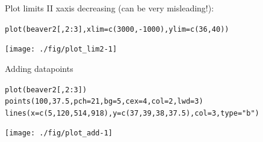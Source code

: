 \documentclass[xcolor=table,           xcolor=dvipsnames]{beamer}\usepackage[]{graphicx}\usepackage[]{color}
\makeatletter
\newcommand{\hlnum}[1]{\textcolor[rgb]{0,0,0}{#1}}
\newcommand{\hlstr}[1]{\textcolor[rgb]{0.545,0.137,0.137}{#1}}
\newcommand{\hlopt}[1]{\textcolor[rgb]{0,0,0}{#1}}
\newcommand{\hlstd}[1]{\textcolor[rgb]{0,0,0}{#1}}
\newcommand{\hlkwc}[1]{\textcolor[rgb]{1,0,1}{#1}}
\newcommand{\hlkwd}[1]{\textcolor[rgb]{0,0,1}{#1}}
\newenvironment{kframe}{%
 \def\at@end@of@kframe{}%
 \ifinner\ifhmode%
  \def\at@end@of@kframe{\end{minipage}}%
  \begin{minipage}{\columnwidth}%
 \fi\fi%
 \def\FrameCommand##1{\hskip\@totalleftmargin \hskip-\fboxsep
 \colorbox{shadecolor}{##1}\hskip-\fboxsep
     \hskip-\linewidth \hskip-\@totalleftmargin \hskip\columnwidth}%
 \MakeFramed {\advance\hsize-\width
   \@totalleftmargin\z@ \linewidth\hsize
   \@setminipage}}%
 {\par\unskip\endMakeFramed%
 \at@end@of@kframe}
\newenvironment{knitrout}{}{} %
\makeatother
\begin{document}

\begin{frame}[fragile]{Plot limits II}
xaxis decreasing (can be very misleading!):
\begin{knitrout}
\color{fgcolor}\begin{kframe}
\begin{alltt}
\hlkwd{plot}\hlstd{(beaver2[ ,}\hlnum{2}\hlopt{:}\hlnum{3}\hlstd{],} \hlkwc{xlim}\hlstd{=}\hlkwd{c}\hlstd{(}\hlnum{3000}\hlstd{,}\hlopt{-}\hlnum{1000}\hlstd{),} \hlkwc{ylim}\hlstd{=}\hlkwd{c}\hlstd{(}\hlnum{36}\hlstd{,}\hlnum{40}\hlstd{))}
\end{alltt}
\end{kframe}

{\centering \texttt{[image: ./fig/plot\_lim2-1]} 

}



\end{knitrout}
\end{frame}


\begin{frame}[fragile]{Adding datapoints}
\begin{knitrout}\scriptsize
{}\color{fgcolor}\begin{kframe}
\begin{alltt}
\hlkwd{plot}\hlstd{(beaver2[ ,}\hlnum{2}\hlopt{:}\hlnum{3}\hlstd{])}
\hlkwd{points}\hlstd{(}\hlnum{100}\hlstd{,} \hlnum{37.5}\hlstd{,} \hlkwc{pch}\hlstd{=}\hlnum{21}\hlstd{,} \hlkwc{bg}\hlstd{=}\hlnum{5}\hlstd{,} \hlkwc{cex}\hlstd{=}\hlnum{4}\hlstd{,} \hlkwc{col}\hlstd{=}\hlnum{2}\hlstd{,} \hlkwc{lwd}\hlstd{=}\hlnum{3}\hlstd{)}
\hlkwd{lines}\hlstd{(}\hlkwc{x}\hlstd{=}\hlkwd{c}\hlstd{(}\hlnum{5}\hlstd{,}\hlnum{120}\hlstd{,}\hlnum{514}\hlstd{,}\hlnum{918}\hlstd{),} \hlkwc{y}\hlstd{=}\hlkwd{c}\hlstd{(}\hlnum{37}\hlstd{,}\hlnum{39}\hlstd{,}\hlnum{38}\hlstd{,}\hlnum{37.5}\hlstd{),} \hlkwc{col}\hlstd{=}\hlnum{3}\hlstd{,} \hlkwc{type}\hlstd{=}\hlstr{"b"}\hlstd{)}
\end{alltt}
\end{kframe}

{\centering \texttt{[image: ./fig/plot\_add-1]} 

}



\end{knitrout}
\end{frame}
\end{document}
